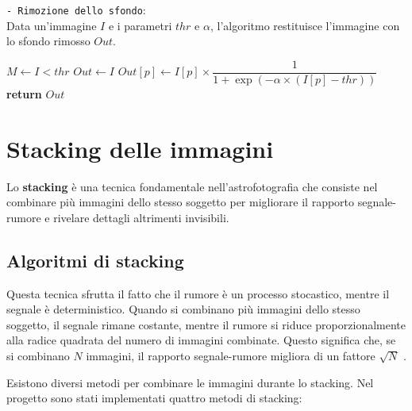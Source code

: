 \begin{algorithm}[H]
    \caption{\texttt{- Rimozione dello sfondo}:\\ Data un'immagine $I$ e i parametri $thr$ e $\alpha$, l'algoritmo restituisce l'immagine con lo sfondo rimosso $Out$.} \label{alg:remove_background}
    \begin{algorithmic}[1]
            \State $M \gets I < thr$ 
            \State $Out \gets I$
                \State $Out[p] \gets I[p] \times \dfrac{1}{1 + \exp(-\alpha \times (I[p] - thr))}$ 
            \EndFor
            \State \textbf{return} $Out$
        \EndFunction
    \end{algorithmic}
\end{algorithm}

\section{Stacking delle immagini} \label{sec:stacking}

Lo \textbf{stacking} è una tecnica fondamentale nell'astrofotografia che consiste nel combinare più immagini dello stesso soggetto per migliorare il rapporto segnale-rumore e rivelare dettagli altrimenti invisibili.

\subsection{Algoritmi di stacking} \label{subsec:stacking}

Questa tecnica sfrutta il fatto che il rumore è un processo stocastico, mentre il segnale è deterministico. Quando si combinano più immagini dello stesso soggetto, il segnale rimane costante, mentre il rumore si riduce proporzionalmente alla radice quadrata del numero di immagini combinate. Questo significa che, se si combinano $N$ immagini, il rapporto segnale-rumore migliora di un fattore $\sqrt{N}$ \cite{stacking}.

Esistono diversi metodi per combinare le immagini durante lo stacking. Nel progetto sono stati implementati quattro metodi di stacking:

